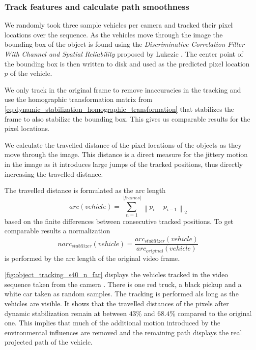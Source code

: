 \subsubsection{Track features and calculate path smoothness}
We randomly took three sample vehicles per camera and tracked their pixel locations over the sequence.
As the vehicles move through the image the bounding box of the object is found using the \emph{Discriminative Correlation Filter With Channel and Spatial Reliability} proposed by Lukezic \etal{} \cite{Lukezic_2017_CVPR,opencv_library}.
The center point of the bounding box is then written to disk and used as the predicted pixel location $p$ of the vehicle.

We only track in the original frame to remove inaccuracies in the tracking and use the homographic transformation matrix from \autoref{eq:dynamic_stabilization_homographic_transformation} that stabilizes the frame to also stabilize the bounding box.
This gives us comparable results for the pixel locations. 

We calculate the travelled distance of the pixel locations of the objects as they move through the image. 
This distance is a direct measure for the jittery motion in the image as it introduces large jumps of the tracked positions, thus directly increasing the travelled distance.

The travelled distance is formulated as the arc length
\begin{equation}
    arc(vehicle) = \sum_{n = 1}^{\left\lvert frames \right\rvert } \left\lVert 
        p_{i} - p_{i-1}
    \right\rVert _2
\end{equation} 
based on the finite differences between consecutive tracked positions.
To get comparable results a normalization 
\begin{equation}
    narc_{stabilizer}(vehicle) = 
    \frac{arc_{stabilizer}(vehicle)}{arc_{original}(vehicle)}
\end{equation} 
is performed by the arc length of the original video frame.

\autoref{fig:object_tracking_s40_n_far} displays the vehicles tracked in the video sequence taken from the camera . 
There is one red truck, a black pickup and a white car taken as random samples.
The tracking is performed als long as the vehicles are visible.
It shows that the travelled distances of the pixels after dynamic stabilization remain at between $43\%$ and $68.4\%$ compared to the original one.   
This implies that much of the additional motion introduced by the environmental influences are removed and the remaining path displays the real projected path of the vehicle. 

